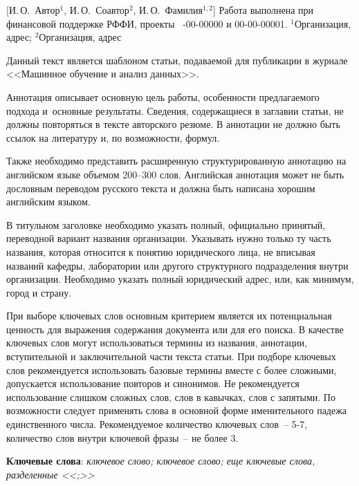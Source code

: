 \documentclass[12pt, twoside]{article}
\begin{document}
    [И.\,О.~Автор$^1$, И.\,О.~Соавтор$^2$, И.\,О.~Фамилия$^{1,2}$] %
\thanksRus
    {Работа выполнена при
     финансовой поддержке РФФИ, проекты \No\ -00-00000 и 00-00-00001.}
\organizationRus
    {$^1$Организация, адрес; $^2$Организация, адрес}
\abstractRus
    {Данный текст является шаблоном статьи, подаваемой для публикации в журнале <<Машинное обучение и анализ данных>>.

    Аннотация описывает основную цель работы,
    особенности предлагаемого подхода и~основные результаты.
    Сведения, содержащиеся в заглавии статьи, не должны повторяться в тексте авторского резюме.
    В аннотации не должно быть ссылок на литературу и, по возможности, формул.
	
	Также необходимо представить расширенную структурированную аннотацию на английском языке объемом 200--300 слов.	
	Английская аннотация может не быть дословным переводом русского текста и должна быть написана хорошим английским языком.
	
	В титульном заголовке необходимо указать полный, официально принятый, переводной вариант названия организации.
	Указывать нужно только ту часть названия, которая относится к понятию юридического лица,
	не вписывая названий кафедры, лаборатории или другого структурного подразделения внутри организации.
	Необходимо указать полный юридический адрес, или, как минимум, город и страну.
 	
 	При выборе ключевых слов основным критерием является их потенциальная ценность для выражения содержания документа или для его поиска.
	В качестве ключевых слов могут использоваться термины из названия, аннотации, вступительной и заключительной части текста статьи.
 	При подборе ключевых слов рекомендуется использовать базовые термины вместе с более сложными, допускается использование повторов и синонимов.
	Не рекомендуется использование слишком сложных слов, слов в кавычках, слов с запятыми.
	По возможности следует применять слова в основной форме именительного падежа единственного числа.
	Рекомендуемое количество ключевых слов~-- 5-7, количество слов внутри ключевой фразы~-- не более 3.
	
\bigskip
\noindent
\textbf{Ключевые слова}: \emph {ключевое слово; ключевое слово; еще ключевые слова, разделенные <<;>>}
}
\end{document}
